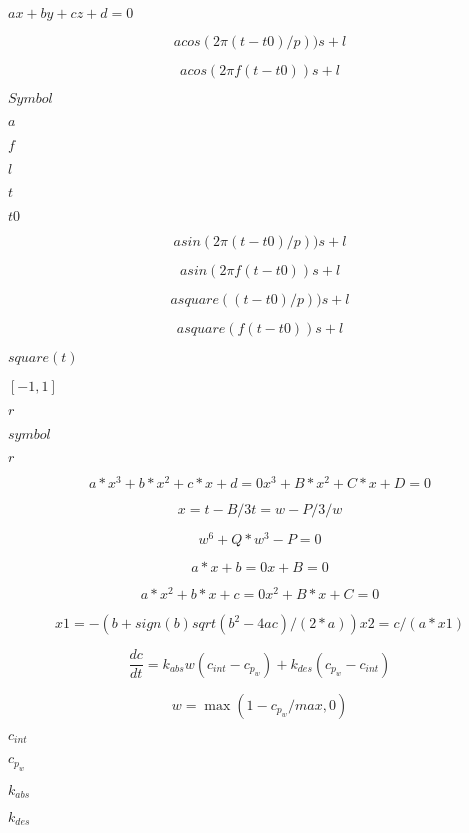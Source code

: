 \documentclass{article}
\begin{document}
$ ax + by + cz + d = 0 $
\pagebreak

\[
        a cos(2 \pi (t - t0) / p)) s + l
    \]
\pagebreak

\[
        a cos(2 \pi f (t - t0)) s + l
    \]
\pagebreak

$        Symbol  $
\pagebreak

$        a       $
\pagebreak

$        f       $
\pagebreak

$        l       $
\pagebreak

$        t       $
\pagebreak

$        t0      $
\pagebreak

\[
        a sin(2 \pi (t - t0) / p)) s + l
    \]
\pagebreak

\[
        a sin(2 \pi f (t - t0)) s + l
    \]
\pagebreak

\[
    a square((t - t0) / p)) s + l
\]
\pagebreak

\[
    a square(f (t - t0)) s + l
\]
\pagebreak

$ square(t) $
\pagebreak

$ [-1, 1] $
\pagebreak

$ r $
\pagebreak

$        symbol  $
\pagebreak

$        r       $
\pagebreak

\[
    a*x^3 + b*x^2 + c*x + d = 0
      x^3 + B*x^2 + C*x + D = 0
\]
\pagebreak

\[
    x = t - B/3
    t = w - P/3/w
\]
\pagebreak

\[
    w^6 + Q*w^3 - P = 0
\]
\pagebreak

\[
    a*x + b = 0
      x + B = 0
\]
\pagebreak

\[
    a*x^2 + b*x + c = 0
      x^2 + B*x + C = 0
\]
\pagebreak

\[
    x1 = - (b + sign(b) sqrt(b^2 - 4ac)/(2*a))

    x2 = c/(a*x1)
\]
\pagebreak

\[
    \frac{d c}{d t} =
        k_{abs} w (c_{int} - c_{p_{w}}) + k_{des} (c_{p_{w}} - c_{int})
\]
\pagebreak

\[
    w = \max(1 - c_{p_{w}}/max, 0)
\]
\pagebreak

$      c_{int}      $
\pagebreak

$      c_{p_{w}}    $
\pagebreak

$      k_{abs}      $
\pagebreak

$      k_{des}      $
\pagebreak
\end{document}
